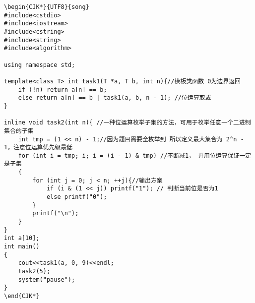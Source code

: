 \documentclass{article}
\begin{document}
\begin{lstlisting}
\begin{CJK*}{UTF8}{song}
#include<cstdio>
#include<iostream>
#include<cstring>
#include<string>
#include<algorithm>

using namespace std;

template<class T> int task1(T *a, T b, int n){//模板类函数 0为边界返回
    if (!n) return a[n] == b;
    else return a[n] == b | task1(a, b, n - 1); //位运算取或
}

inline void task2(int n){ //一种位运算枚举子集的方法，可用于枚举任意一个二进制集合的子集
    int tmp = (1 << n) - 1;//因为题目需要全枚举到 所以定义最大集合为 2^n - 1，注意位运算优先级最低
    for (int i = tmp; i; i = (i - 1) & tmp) //不断减1， 并用位运算保证一定是子集
    {
        for (int j = 0; j < n; ++j){//输出方案
            if (i & (1 << j)) printf("1"); // 判断当前位是否为1
            else printf("0");
        }
        printf("\n");
    }
}
int a[10];
int main()
{
    cout<<task1(a, 0, 9)<<endl;
    task2(5);
    system("pause");
}
\end{CJK*}
\end{lstlisting}
\end{document}
